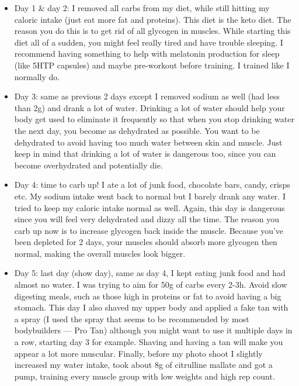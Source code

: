 \documentclass[openany, 12pt]{book}
\begin{document}
        \begin{itemize}
          \item Day 1 \& day 2: I removed all carbs from my diet, while still hitting my caloric intake (just eat more fat and proteins). This diet is the keto diet. The reason you do this is to
            get rid of all glycogen in muscles. While starting this diet all of a sudden, you might feel really tired and have trouble sleeping. I recommend having something to help with melatonin
            production for sleep (like 5HTP capsules) and maybe pre-workout before training. I trained like I normally do.
          \item Day 3: same as previous 2 days except I removed sodium as well (had less than 2g) and drank a lot of water. Drinking a lot of water should help your body get used to eliminate it
            frequently so that when you stop drinking water the next day, you become as dehydrated as possible. You want to be dehydrated to avoid having too much water between skin and
            muscle. Just keep in mind that drinking a lot of water is dangerous too, since you can
            become overhydrated and potentially die.
          \item Day 4: time to carb up! I ate a lot of junk food, chocolate bars, candy, crisps etc. My sodium intake went back to normal but I barely drank any water.
            I tried to keep my caloric intake normal as well. Again, this day is dangerous
            since you will feel very dehydrated and dizzy all the time. The reason you carb up now is to increase glycogen back inside the muscle. Because you've been depleted for 2 days,
            your muscles should absorb more glycogen then normal, making the overall muscles look bigger.
          \item Day 5: last day (show day), same as day 4, I kept eating junk food and had almost no water. I was trying to aim for 50g of carbs every 2-3h.
            Avoid slow digesting meals, such as those high in proteins or fat to avoid having a big
            stomach. This day I also shaved my upper body and applied a fake tan with a spray (I used the spray that seems to be recommended by most bodybuilders --- Pro Tan)
            although you might want to use it multiple days in a row, starting day 3 for example.
            Shaving and having a tan will make you appear a lot more muscular. Finally, before my photo shoot I slightly increased my water intake, took about 8g of citrulline mallate and got a pump,
            training every muscle group with low weights and high rep count.
        \end{itemize}
\end{document}
